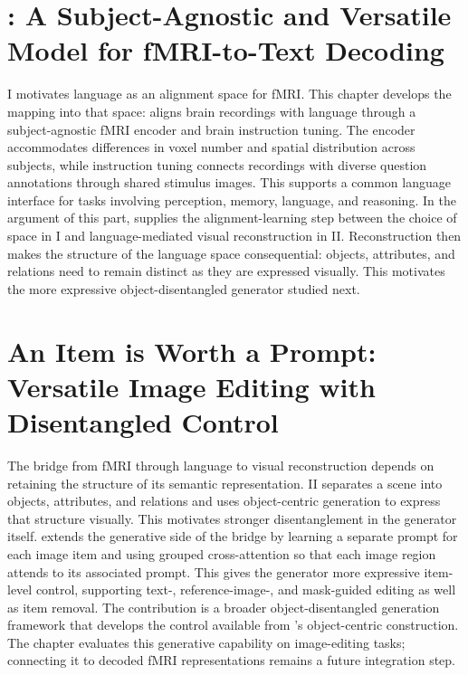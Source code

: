 

\chapter{\mindllm{}: A Subject-Agnostic and Versatile Model for fMRI-to-Text Decoding}
\label{chapter:mindllm}

\prism{} I motivates language as an alignment space for fMRI. This chapter develops the mapping into that space: \mindllm{} aligns brain recordings with language through a subject-agnostic fMRI encoder and brain instruction tuning. The encoder accommodates differences in voxel number and spatial distribution across subjects, while instruction tuning connects recordings with diverse question annotations through shared stimulus images. This supports a common language interface for tasks involving perception, memory, language, and reasoning. In the argument of this part, \mindllm{} supplies the alignment-learning step between the choice of space in \prism{} I and language-mediated visual reconstruction in \prism{} II. Reconstruction then makes the structure of the language space consequential: objects, attributes, and relations need to remain distinct as they are expressed visually. This motivates the more expressive object-disentangled generator studied next.



\chapter{An Item is Worth a Prompt: Versatile Image Editing with Disentangled Control}
\label{chapter:dedit}

The bridge from fMRI through language to visual reconstruction depends on retaining the structure of its semantic representation. \prism{} II separates a scene into objects, attributes, and relations and uses object-centric generation to express that structure visually. This motivates stronger disentanglement in the generator itself. \dedit{} extends the generative side of the bridge by learning a separate prompt for each image item and using grouped cross-attention so that each image region attends to its associated prompt. This gives the generator more expressive item-level control, supporting text-, reference-image-, and mask-guided editing as well as item removal. The contribution is a broader object-disentangled generation framework that develops the control available from \prism{}'s object-centric construction. The chapter evaluates this generative capability on image-editing tasks; connecting it to decoded fMRI representations remains a future integration step.


